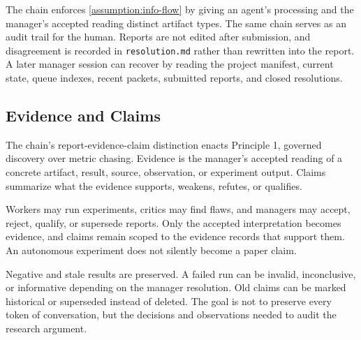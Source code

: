 The chain enforces \cref{assumption:info-flow} by giving an agent's processing and the manager's accepted reading distinct artifact types. The same chain serves as an audit trail for the human. Reports are not edited after submission, and disagreement is recorded in \texttt{resolution.md} rather than rewritten into the report. A later manager session can recover by reading the project manifest, current state, queue indexes, recent packets, submitted reports, and closed resolutions.

\subsection{Evidence and Claims}

The chain's report-evidence-claim distinction enacts Principle 1, governed discovery over metric chasing. Evidence is the manager's accepted reading of a concrete artifact, result, source, observation, or experiment output. Claims summarize what the evidence supports, weakens, refutes, or qualifies.

Workers may run experiments, critics may find flaws, and managers may accept, reject, qualify, or supersede reports. Only the accepted interpretation becomes evidence, and claims remain scoped to the evidence records that support them. An autonomous experiment does not silently become a paper claim.

Negative and stale results are preserved. A failed run can be invalid, inconclusive, or informative depending on the manager resolution. Old claims can be marked historical or superseded instead of deleted. The goal is not to preserve every token of conversation, but the decisions and observations needed to audit the research argument.

